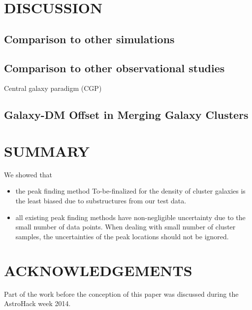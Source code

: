 \section{DISCUSSION}



\label{sec:discussion}
\subsection{Comparison to other simulations}
\subsection{Comparison to other observational studies}
Central galaxy paradigm (CGP)


\subsection{Galaxy-DM Offset in Merging Galaxy Clusters}

\section{SUMMARY}
We showed that 
\begin{itemize}
		\item  the peak finding method To-be-finalized for the density of cluster
			galaxies is the least biased due to substructures from our test data. 
		\item  all existing peak finding methods have non-negligible uncertainty 
			due to the small number of data points. When dealing with small number of
			cluster samples, the uncertainties of the peak locations should not be
			ignored.
\end{itemize}




\section{ACKNOWLEDGEMENTS}
Part of the work before the conception of this paper was discussed during the AstroHack week
2014.




